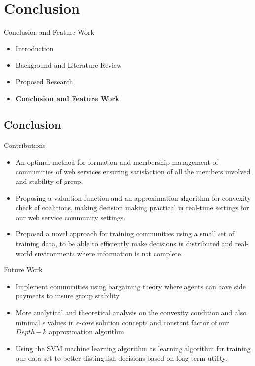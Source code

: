 \documentclass{beamer}
\begin{document}
\section{Conclusion}
\begin{frame}{Conclusion and Feature Work}
    \begin{itemize}
     	\itemsep=.5cm
    	\item Introduction
    	\item Background and Literature Review
    	\item Proposed Research
    	\item {\bf Conclusion and Feature Work}
    \end{itemize}
\end{frame}

\subsection{Conclusion}
\begin{frame}{Contributions}
    \begin{itemize}     	
        	\item An optimal method for formation and membership management of communities of web services ensuring satisfaction of all the members involved and stability of group.
        	\item Proposing a valuation function and an approximation algorithm for convexity check of coalitions, making decision making practical in real-time settings for our web service community settings.
        	\item Proposed a novel approach for training communities using a small set of training data, to be able to efficiently make decisions in distributed and real-world environments where information is not complete.
    \end{itemize}
\end{frame}

\begin{frame}{Future Work}
    \begin{itemize}     	
    	\item Implement communities using bargaining theory where agents can have side payments to insure group stability
    	\item More analytical and theoretical analysis on the convexity condition and also minimal $\epsilon$ values in \emph{$\epsilon$-core} solution concepts and constant factor  of our $Depth-k$ approximation algorithm.
    	\item Using the SVM machine learning algorithm as learning algorithm for training our data set to better distinguish decisions based on long-term utility.
    \end{itemize}
\end{frame}
\end{document}
